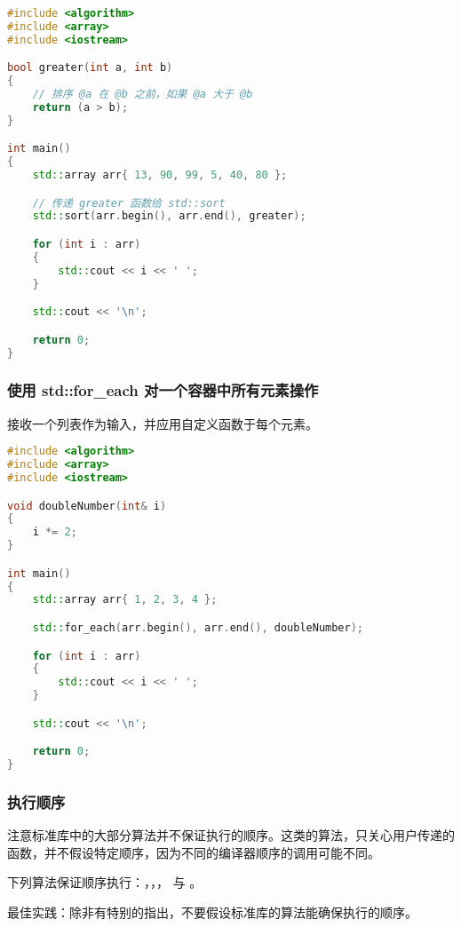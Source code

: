 \documentclass[../../LearnCpp.tex]{subfiles}
\begin{document}
\begin{lstlisting}[language=C++]
#include <algorithm>
#include <array>
#include <iostream>

bool greater(int a, int b)
{
    // 排序 @a 在 @b 之前，如果 @a 大于 @b
    return (a > b);
}

int main()
{
    std::array arr{ 13, 90, 99, 5, 40, 80 };

    // 传递 greater 函数给 std::sort
    std::sort(arr.begin(), arr.end(), greater);

    for (int i : arr)
    {
        std::cout << i << ' ';
    }

    std::cout << '\n';

    return 0;
}
\end{lstlisting}

\subsubsection*{使用 std::for\_each 对一个容器中所有元素操作}

 接收一个列表作为输入，并应用自定义函数于每个元素。

\begin{lstlisting}[language=C++]
#include <algorithm>
#include <array>
#include <iostream>

void doubleNumber(int& i)
{
    i *= 2;
}

int main()
{
    std::array arr{ 1, 2, 3, 4 };

    std::for_each(arr.begin(), arr.end(), doubleNumber);

    for (int i : arr)
    {
        std::cout << i << ' ';
    }

    std::cout << '\n';

    return 0;
}
\end{lstlisting}

\subsubsection*{执行顺序}

注意标准库中的大部分算法并不保证执行的顺序。这类的算法，只关心用户传递的函数，并不假设特定顺序，因为不同的编译器顺序的调用可能不同。

下列算法保证顺序执行：，，， 与 。

最佳实践：除非有特别的指出，不要假设标准库的算法能确保执行的顺序。
\end{document}
